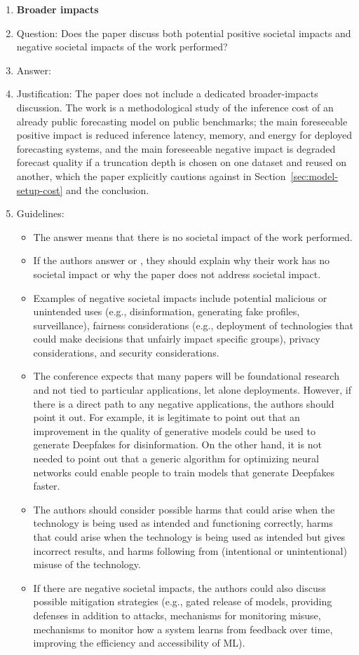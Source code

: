 \begin{enumerate}
\item {\bf Broader impacts}
    \item[] Question: Does the paper discuss both potential positive societal impacts and negative societal impacts of the work performed?
    \item[] Answer: \answerNo{}
    \item[] Justification: The paper does not include a dedicated broader-impacts discussion. The work is a methodological study of the inference cost of an already public forecasting model on public benchmarks; the main foreseeable positive impact is reduced inference latency, memory, and energy for deployed forecasting systems, and the main foreseeable negative impact is degraded forecast quality if a truncation depth is chosen on one dataset and reused on another, which the paper explicitly cautions against in Section~\ref{sec:model-setup-cost} and the conclusion.
    \item[] Guidelines:
    \begin{itemize}
        \item The answer \answerNA{} means that there is no societal impact of the work performed.
        \item If the authors answer \answerNA{} or \answerNo, they should explain why their work has no societal impact or why the paper does not address societal impact.
        \item Examples of negative societal impacts include potential malicious or unintended uses (e.g., disinformation, generating fake profiles, surveillance), fairness considerations (e.g., deployment of technologies that could make decisions that unfairly impact specific groups), privacy considerations, and security considerations.
        \item The conference expects that many papers will be foundational research and not tied to particular applications, let alone deployments. However, if there is a direct path to any negative applications, the authors should point it out. For example, it is legitimate to point out that an improvement in the quality of generative models could be used to generate Deepfakes for disinformation. On the other hand, it is not needed to point out that a generic algorithm for optimizing neural networks could enable people to train models that generate Deepfakes faster.
        \item The authors should consider possible harms that could arise when the technology is being used as intended and functioning correctly, harms that could arise when the technology is being used as intended but gives incorrect results, and harms following from (intentional or unintentional) misuse of the technology.
        \item If there are negative societal impacts, the authors could also discuss possible mitigation strategies (e.g., gated release of models, providing defenses in addition to attacks, mechanisms for monitoring misuse, mechanisms to monitor how a system learns from feedback over time, improving the efficiency and accessibility of ML).
    \end{itemize}
    

\end{enumerate}
